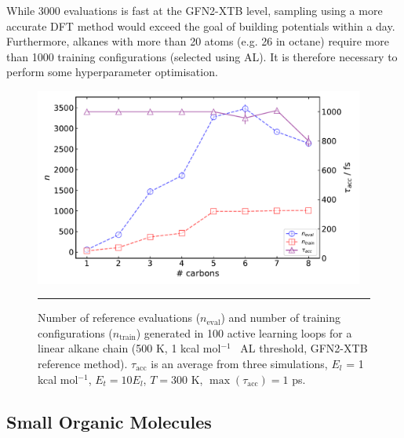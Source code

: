 \documentclass[11pt]{article}
\numberwithin{equation}{subsection}
\newcommand{\kcal}{kcal mol$^{-1}$}
\newcommand{\comment}[1]{}
\begin{document}
While 3000 evaluations is fast at the GFN2-XTB level, sampling using a more accurate DFT method would exceed the goal of building potentials within a day. Furthermore, alkanes with more than 20 atoms (e.g. 26 in octane) require more than 1000 training configurations (selected using AL). It is therefore necessary to perform some hyperparameter optimisation.


\begin{figure}[h!]
	\centering
	\vspace{0.4cm}
	\includegraphics[height=6.5cm]{figSX3.pdf}
	\vspace{0.1cm}
	\hrule
	\vspace{0.1cm}
	\caption{Number of reference evaluations ($n_\text{eval}$) and number of training configurations ($n_\text{train}$) generated in 100 active learning loops for a linear alkane chain (500 K, 1 \kcal~ AL threshold, GFN2-XTB reference method). $\tau_\text{acc}$ is an average from three simulations, $E_l$ = 1 \kcal, $E_t = 10E_l$, $T = 300$ K, $\max(\tau_\text{acc}) = 1$ ps.}
	\label{fig::SX3}
\end{figure}


\subsection{Small Organic Molecules}


\comment{
	TJW:  Maybe not worth the faff for the SI, but can we have the numbers not overlapping? It makes 23(?) and 29(?) hard to see on the n_train graph.
	TJW: It's interesting that benzene is so low, while cyclohexane is fairly high, even though they are both quite symmetric (other than the different conformations cyclohexane can take.
	TJW: Can you mention a brief summary of what the complexity metric is and can you also mention in the S3 caption you have scaled the values by this complexity metric?
}
\end{document}

